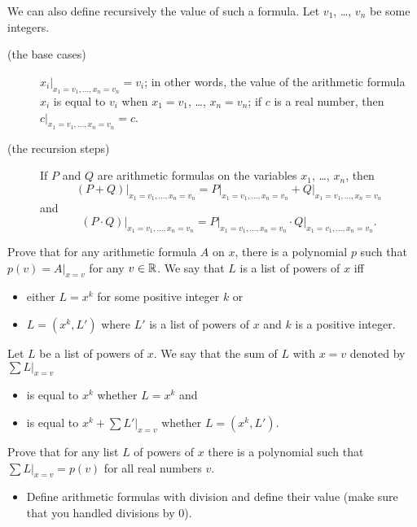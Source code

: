 \begin{chapterendexercises}
        We can also define recursively the value of such a formula.
        Let $v_1$, \dots, $v_n$ be some integers.
        \begin{description}
            \item[(the base cases)] $x_i\big\rvert_{x_1 = v_1, \dots, x_n = v_n} = v_i$; in
                other words, the value of the arithmetic formula $x_i$ is equal to $v_i$
                when $x_1 = v_1$, \dots, $x_n = v_n$; if $c$ is a real number, then
                $c\rvert_{x_1 = v_1, \dots, x_n = v_n} = c$.
            \item[(the recursion steps)] If $P$ and $Q$ are arithmetic formulas on the
            variables $x_1$, \dots, $x_n$, then
            \[
                (P + Q)\big\rvert_{x_1 = v_1, \dots, x_n = v_n} =
                P\big\rvert_{x_1 = v_1, \dots, x_n = v_n} +
                Q\big\rvert_{x_1 = v_1, \dots, x_n = v_n}
            \]
            and
            \[
                (P \cdot Q)\big\rvert_{x_1 = v_1, \dots, x_n = v_n} =
                P\big\rvert_{x_1 = v_1, \dots, x_n = v_n} \cdot
                Q\big\rvert_{x_1 = v_1, \dots, x_n = v_n}.
            \]
        \end{description}

        Prove that for any arithmetic formula $A$ on $x$, there is a polynomial
        $p$ such that $p(v) = A\big\rvert_{x = v}$ for any $v \in \mathbb{R}$.
    \exercise We say that $L$ is a list of powers of $x$ iff
        \begin{itemize}
            \item either $L = x^k$ for some positive integer $k$ or
            \item $L = (x^k, L')$ where $L'$ is a list of powers of $x$ and
                $k$ is a positive integer.
        \end{itemize}

        Let $L$ be a list of powers of $x$. We say that the sum of $L$
        with $x = v$ denoted by $\sum L\big\rvert_{x = v}$
        \begin{itemize}
            \item is equal to $x^k$ whether $L = x^k$ and
            \item is equal to $x^k + \sum L'\big\rvert_{x = v}$ whether
                $L = (x^k, L')$.
        \end{itemize}

        Prove that for any list $L$ of powers of $x$ there is a polynomial such that
        $\sum L\big\rvert_{x = v} = p(v)$ for all real numbers $v$.
    \exercise
        \begin{itemize}
            \item Define arithmetic formulas with division and define their value (make
                sure that you handled divisions by $0$).


\end{itemize}
\end{chapterendexercises}
